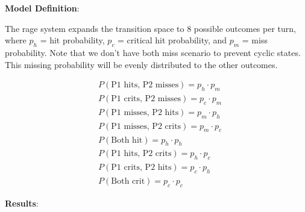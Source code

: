 \documentclass{article}
\begin{document}
\textbf{Model Definition}: 

The rage system expands the transition space to 8 possible outcomes per turn, where $p_h$ = hit probability, $p_c$ = critical hit probability, and $p_m$ = miss probability.
Note that we don't have both miss scenario to prevent cyclic states. This missing probability will be evenly distributed to the other outcomes.

\begin{align}
&P(\text{P1 hits, P2 misses}) = p_h \cdot p_m \\
&P(\text{P1 crits, P2 misses}) = p_c \cdot p_m \\
&P(\text{P1 misses, P2 hits}) = p_m \cdot p_h \\
&P(\text{P1 misses, P2 crits}) = p_m \cdot p_c \\
&P(\text{Both hit}) = p_h \cdot p_h \\
&P(\text{P1 hits, P2 crits}) = p_h \cdot p_c \\
&P(\text{P1 crits, P2 hits}) = p_c \cdot p_h \\
&P(\text{Both crit}) = p_c \cdot p_c
\end{align}

\textbf{Results}:
\end{document}
